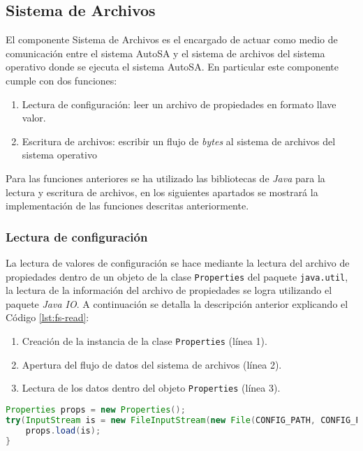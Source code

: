 \subsection{Sistema de Archivos}
El componente Sistema de Archivos es el encargado de actuar como medio de comunicación entre el sistema AutoSA y el sistema de archivos del sistema operativo donde se ejecuta el sistema AutoSA. En particular este componente cumple con dos funciones:
\begin{enumerate}
	\item Lectura de configuración: leer un archivo de propiedades en formato llave valor.
	\item Escritura de archivos: escribir un flujo de \textit{bytes} al sistema de archivos del sistema operativo
\end{enumerate}
Para las funciones anteriores se ha utilizado las bibliotecas de \textit{Java} para la lectura y escritura de archivos, en los siguientes apartados se mostrará la implementación de las funciones descritas anteriormente.

\subsubsection{Lectura de configuración}
La lectura de valores de configuración se hace mediante la lectura del archivo de propiedades dentro de un objeto de la clase \texttt{Properties} del paquete \texttt{java.util}, la lectura de la información del archivo de propiedades se logra utilizando el paquete \textit{Java IO}. A continuación se detalla la descripción anterior explicando el Código \ref{lst:fs-read}:

\begin{enumerate}
 	\item Creación de la instancia de la clase \texttt{Properties} (línea 1).
 	\item Apertura del flujo de datos del sistema de archivos (línea 2).
 	\item Lectura de los datos dentro del objeto \texttt{Properties} (línea 3).
 \end{enumerate}

\begin{lstlisting}[language=Java, caption={Lectura de un archivo de propiedades.}, captionpos=b, label={lst:fs-read}]
Properties props = new Properties();
try(InputStream is = new FileInputStream(new File(CONFIG_PATH, CONFIG_FILENAME));){
	props.load(is);
}
\end{lstlisting}

